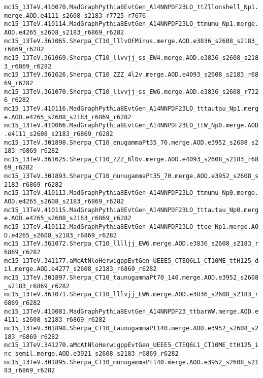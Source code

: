 \texttt{mc15\_13TeV.410070.MadGraphPythia8EvtGen\_A14NNPDF23LO\_ttZllonshell\_Np1.merge.AOD.e4111\_s2608\_s2183\_r7725\_r7676} \\
\texttt{mc15\_13TeV.410114.MadGraphPythia8EvtGen\_A14NNPDF23LO\_ttmumu\_Np1.merge.AOD.e4265\_s2608\_s2183\_r6869\_r6282} \\
\texttt{mc15\_13TeV.361065.Sherpa\_CT10\_lllvOFMinus.merge.AOD.e3836\_s2608\_s2183\_r6869\_r6282} \\
\texttt{mc15\_13TeV.361069.Sherpa\_CT10\_llvvjj\_ss\_EW4.merge.AOD.e3836\_s2608\_s2183\_r6869\_r6282} \\
\texttt{mc15\_13TeV.361626.Sherpa\_CT10\_ZZZ\_4l2v.merge.AOD.e4093\_s2608\_s2183\_r6869\_r6282} \\
\texttt{mc15\_13TeV.361070.Sherpa\_CT10\_llvvjj\_ss\_EW6.merge.AOD.e3836\_s2608\_r7326\_r6282} \\
\texttt{mc15\_13TeV.410116.MadGraphPythia8EvtGen\_A14NNPDF23LO\_tttautau\_Np1.merge.AOD.e4265\_s2608\_s2183\_r6869\_r6282} \\
\texttt{mc15\_13TeV.410066.MadGraphPythia8EvtGen\_A14NNPDF23LO\_ttW\_Np0.merge.AOD.e4111\_s2608\_s2183\_r6869\_r6282} \\
\texttt{mc15\_13TeV.301890.Sherpa\_CT10\_enugammaPt35\_70.merge.AOD.e3952\_s2608\_s2183\_r6869\_r6282} \\
\texttt{mc15\_13TeV.361625.Sherpa\_CT10\_ZZZ\_6l0v.merge.AOD.e4093\_s2608\_s2183\_r6869\_r6282} \\
\texttt{mc15\_13TeV.301893.Sherpa\_CT10\_munugammaPt35\_70.merge.AOD.e3952\_s2608\_s2183\_r6869\_r6282} \\
\texttt{mc15\_13TeV.410113.MadGraphPythia8EvtGen\_A14NNPDF23LO\_ttmumu\_Np0.merge.AOD.e4265\_s2608\_s2183\_r6869\_r6282} \\
\texttt{mc15\_13TeV.410115.MadGraphPythia8EvtGen\_A14NNPDF23LO\_tttautau\_Np0.merge.AOD.e4265\_s2608\_s2183\_r6869\_r6282} \\
\texttt{mc15\_13TeV.410112.MadGraphPythia8EvtGen\_A14NNPDF23LO\_ttee\_Np1.merge.AOD.e4265\_s2608\_s2183\_r6869\_r6282} \\
\texttt{mc15\_13TeV.361072.Sherpa\_CT10\_lllljj\_EW6.merge.AOD.e3836\_s2608\_s2183\_r6869\_r6282} \\
\texttt{mc15\_13TeV.341177.aMcAtNloHerwigppEvtGen\_UEEE5\_CTEQ6L1\_CT10ME\_ttH125\_dil.merge.AOD.e4277\_s2608\_s2183\_r6869\_r6282} \\
\texttt{mc15\_13TeV.301897.Sherpa\_CT10\_taunugammaPt70\_140.merge.AOD.e3952\_s2608\_s2183\_r6869\_r6282} \\
\texttt{mc15\_13TeV.361071.Sherpa\_CT10\_lllvjj\_EW6.merge.AOD.e3836\_s2608\_s2183\_r6869\_r6282} \\
\texttt{mc15\_13TeV.410081.MadGraphPythia8EvtGen\_A14NNPDF23\_ttbarWW.merge.AOD.e4111\_s2608\_s2183\_r6869\_r6282} \\
\texttt{mc15\_13TeV.301898.Sherpa\_CT10\_taunugammaPt140.merge.AOD.e3952\_s2608\_s2183\_r6869\_r6282} \\
\texttt{mc15\_13TeV.341270.aMcAtNloHerwigppEvtGen\_UEEE5\_CTEQ6L1\_CT10ME\_ttH125\_inc\_semil.merge.AOD.e3921\_s2608\_s2183\_r6869\_r6282} \\
\texttt{mc15\_13TeV.301895.Sherpa\_CT10\_munugammaPt140.merge.AOD.e3952\_s2608\_s2183\_r6869\_r6282} \\
